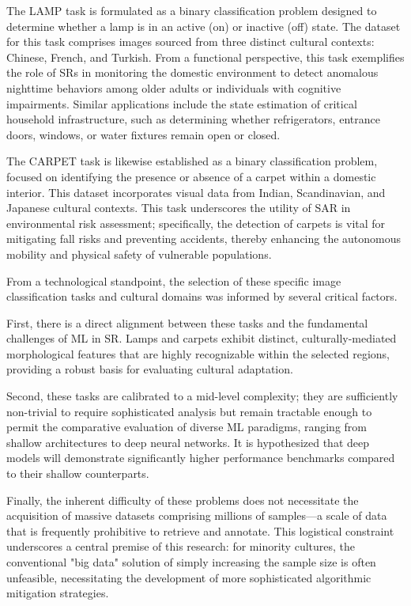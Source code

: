 The LAMP task is formulated as a binary classification problem designed to determine whether a lamp is in an active (on) or inactive (off) state. The dataset for this task comprises images sourced from three distinct cultural contexts: Chinese, French, and Turkish. 
From a functional perspective, this task exemplifies the role of SRs in monitoring the domestic environment to detect anomalous nighttime behaviors among older adults or individuals with cognitive impairments. 
Similar applications include the state estimation of critical household infrastructure, such as determining whether refrigerators, entrance doors, windows, or water fixtures remain open or closed.

The CARPET task is likewise established as a binary classification problem, focused on identifying the presence or absence of a carpet within a domestic interior. 
This dataset incorporates visual data from Indian, Scandinavian, and Japanese cultural contexts. 
This task underscores the utility of SAR in environmental risk assessment; specifically, the detection of carpets is vital for mitigating fall risks and preventing accidents, thereby enhancing the autonomous mobility and physical safety of vulnerable populations.

From a technological standpoint, the selection of these specific image classification tasks and cultural domains was informed by several critical factors.

First, there is a direct alignment between these tasks and the fundamental challenges of ML in SR. 
Lamps and carpets exhibit distinct, culturally-mediated morphological features that are highly recognizable within the selected regions, providing a robust basis for evaluating cultural adaptation.

Second, these tasks are calibrated to a mid-level complexity; they are sufficiently non-trivial to require sophisticated analysis but remain tractable enough to permit the comparative evaluation of diverse ML paradigms, ranging from shallow architectures to deep neural networks. 
It is hypothesized that deep models will demonstrate significantly higher performance benchmarks compared to their shallow counterparts.

Finally, the inherent difficulty of these problems does not necessitate the acquisition of massive datasets comprising millions of samples—a scale of data that is frequently prohibitive to retrieve and annotate. 
This logistical constraint underscores a central premise of this research: for minority cultures, the conventional "big data" solution of simply increasing the sample size is often unfeasible, necessitating the development of more sophisticated algorithmic mitigation strategies.


